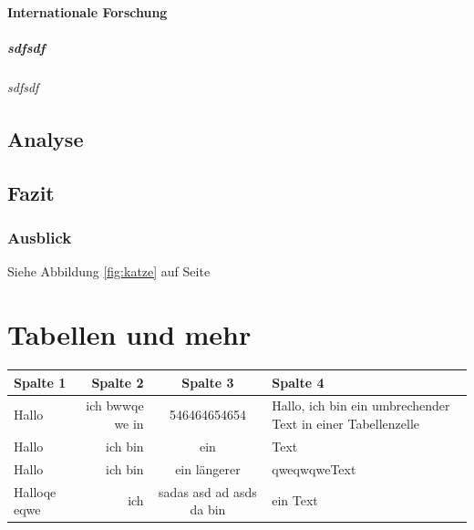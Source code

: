 \documentclass[12pt,ngerman,parskip=half]{scrreport}
\begin{document}
\subsubsection{Internationale Forschung}

\blindtext

\paragraph{sdfsdf} \blindtext

\subparagraph{sdfsdf} \blindtext


\section{Analyse}

\blindtext[5]

\section{Fazit}

\subsection{Ausblick}\label{sec:ausblick} 

Siehe Abbildung \ref{fig:katze} auf Seite \pageref{fig:katze}


\blindtext

\chapter{Tabellen und mehr}

\blindtext

\begin{tabular}{|l|r|c|p{4cm}|} \hline
\textbf{Spalte 1 } & \textbf{Spalte 2}  & \textbf{Spalte 3}  & \textbf{Spalte 4 } \\ \hline
Hallo & ich bwwqe we in &  546464654654 & Hallo, ich bin ein umbrechender Text in einer Tabellenzelle \\
Hallo & ich bin & ein & Text \\
Hallo & ich bin & ein längerer & qweqwqweText \\
Halloqe  eqwe  & ich & sadas asd ad asds da bin & ein Text \\ \hline
\end{tabular}
\end{document}
